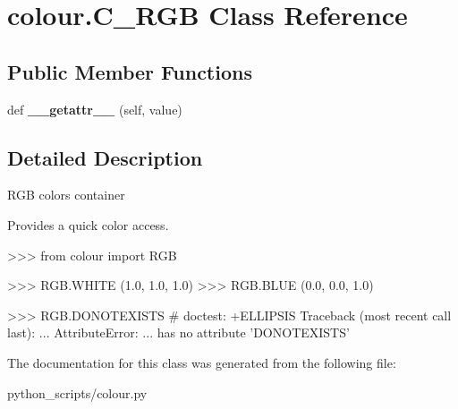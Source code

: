 \hypertarget{classcolour_1_1C__RGB}{}\section{colour.\+C\+\_\+\+R\+G\+B Class Reference}
\label{classcolour_1_1C__RGB}
\subsection*{Public Member Functions}
\begin{DoxyCompactItemize}
\item 
\hypertarget{classcolour_1_1C__RGB_a043e1602da9fe5ee431a063f0011b3a8}{}def {\bfseries \+\_\+\+\_\+getattr\+\_\+\+\_\+} (self, value)\label{classcolour_1_1C__RGB_a043e1602da9fe5ee431a063f0011b3a8}

\end{DoxyCompactItemize}


\subsection{Detailed Description}
\begin{DoxyVerb}RGB colors container

Provides a quick color access.

>>> from colour import RGB

>>> RGB.WHITE
(1.0, 1.0, 1.0)
>>> RGB.BLUE
(0.0, 0.0, 1.0)

>>> RGB.DONOTEXISTS  # doctest: +ELLIPSIS
Traceback (most recent call last):
...
AttributeError: ... has no attribute 'DONOTEXISTS'\end{DoxyVerb}
 

The documentation for this class was generated from the following file\+:\begin{DoxyCompactItemize}
\item 
python\+\_\+scripts/colour.\+py\end{DoxyCompactItemize}
